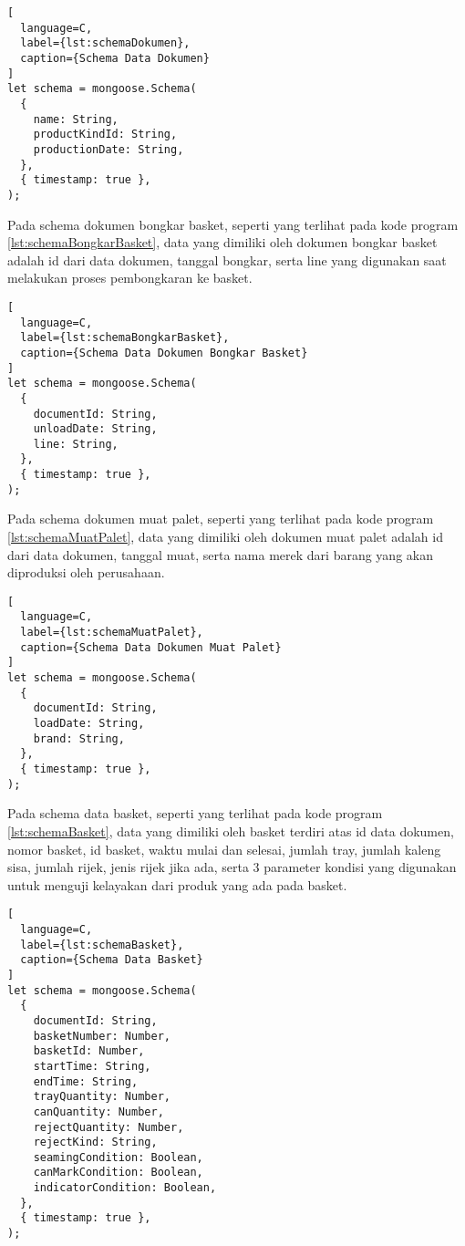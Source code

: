 \newpage

\begin{lstlisting}[
  language=C,
  label={lst:schemaDokumen},
  caption={Schema Data Dokumen}
]
let schema = mongoose.Schema(
  {
    name: String,
    productKindId: String,
    productionDate: String,
  },
  { timestamp: true },
);
\end{lstlisting}
\vspace{0.5ex}

Pada schema dokumen bongkar basket, seperti yang terlihat pada kode program \ref{lst:schemaBongkarBasket}, data yang dimiliki oleh dokumen bongkar basket adalah id dari data dokumen, tanggal bongkar, serta line yang digunakan saat melakukan proses pembongkaran ke basket.
\vspace{0.5ex}

\begin{lstlisting}[
  language=C,
  label={lst:schemaBongkarBasket},
  caption={Schema Data Dokumen Bongkar Basket}
]
let schema = mongoose.Schema(
  {
    documentId: String,
    unloadDate: String,
    line: String,
  },
  { timestamp: true },
);
\end{lstlisting}
\vspace{0.5ex}

Pada schema dokumen muat palet, seperti yang terlihat pada kode program \ref{lst:schemaMuatPalet}, data yang dimiliki oleh dokumen muat palet adalah id dari data dokumen, tanggal muat, serta nama merek dari barang yang akan diproduksi oleh perusahaan.
\vspace{0.5ex}

\begin{lstlisting}[
  language=C,
  label={lst:schemaMuatPalet},
  caption={Schema Data Dokumen Muat Palet}
]
let schema = mongoose.Schema(
  {
    documentId: String,
    loadDate: String,
    brand: String,
  },
  { timestamp: true },
);
\end{lstlisting}
\vspace{0.5ex}

\newpage

Pada schema data basket, seperti yang terlihat pada kode program \ref{lst:schemaBasket}, data yang dimiliki oleh basket terdiri atas id data dokumen, nomor basket, id basket, waktu mulai dan selesai, jumlah tray, jumlah kaleng sisa, jumlah rijek, jenis rijek jika ada, serta 3 parameter kondisi yang digunakan untuk menguji kelayakan dari produk yang ada pada basket.
\vspace{0.5ex}

\begin{lstlisting}[
  language=C,
  label={lst:schemaBasket},
  caption={Schema Data Basket}
]
let schema = mongoose.Schema(
  {
    documentId: String,
    basketNumber: Number,
    basketId: Number,
    startTime: String,
    endTime: String,
    trayQuantity: Number,
    canQuantity: Number,
    rejectQuantity: Number,
    rejectKind: String,
    seamingCondition: Boolean,
    canMarkCondition: Boolean,
    indicatorCondition: Boolean,
  },
  { timestamp: true },
);
\end{lstlisting}
\vspace{0.5ex}


